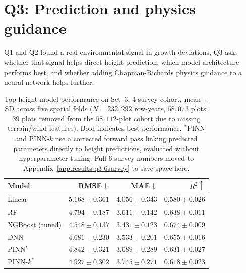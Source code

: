 \documentclass[logo,msc,ai]{infthesis}           %
\begin{document}
\section{Q3: Prediction and physics guidance}
Q1 and Q2 found a real environmental signal in growth deviations, Q3 asks whether that signal helps direct height prediction, which model architecture performs best, and whether adding Chapman-Richards physics guidance to a neural network helps further.


\begin{table}[!htbp]
\centering
\scriptsize
\setlength{\tabcolsep}{4pt}
\renewcommand{\arraystretch}{1.2}
\begin{tabular*}{\textwidth}{@{\extracolsep{\fill}}lrrr@{}}\toprule
Model & RMSE${\downarrow}$ & MAE${\downarrow}$ & $R^2{\uparrow}$ \\
\midrule
Linear & $5.168{\pm}0.361$ & $4.056{\pm}0.343$ & $0.580{\pm}0.026$ \\
RF & $4.794{\pm}0.187$ & $3.611{\pm}0.142$ & $0.638{\pm}0.011$ \\
XGBoost (tuned) & $\mathbf{4.548{\pm}0.137}$ & $\mathbf{3.431{\pm}0.123}$ & $\mathbf{0.674{\pm}0.009}$ \\
DNN & $4.681{\pm}0.230$ & $3.533{\pm}0.201$ & $0.655{\pm}0.016$ \\
PINN$^*$ & $4.842{\pm}0.321$ & $3.689{\pm}0.289$ & $0.631{\pm}0.027$ \\
PINN-$k^*$ & $4.927{\pm}0.302$ & $3.745{\pm}0.271$ & $0.618{\pm}0.023$ \\
\bottomrule
\end{tabular*}
\caption{\footnotesize{Top-height model performance on Set~3, 4-survey cohort, mean $\pm$ SD
across five spatial folds ($N=232{,}292$ row-years, $58{,}073$ plots; 39 plots removed from the
$58{,}112$-plot cohort due to missing terrain/wind features). Bold indicates best performance.
$^*$PINN and PINN-$k$ use a corrected forward pass linking predicted parameters directly to
height predictions, evaluated without hyperparameter tuning. Full 6-survey numbers moved to
Appendix~\ref{app:results-q3-6survey} to save space here.}}
\label{tab:results-q3}
\end{table}
\end{document}
